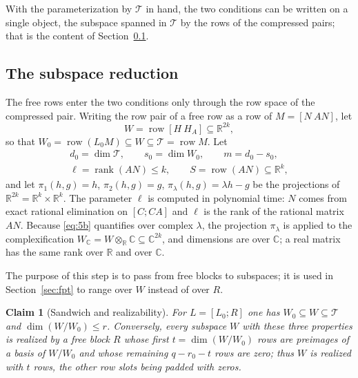 \documentclass[journal]{IEEEtran}
\theoremstyle{plainn}
\newtheorem{claim}{Claim}
\theoremstyle{remark}
\begin{document}
With the parameterization by $\mathcal T$ in hand, the two conditions can be written on a single
object, the subspace spanned in $\mathcal T$ by the rows of the compressed pairs; that is the content
of Section~\ref{sec:subspace}.

\subsection{The subspace reduction}\label{sec:subspace}

The free rows enter the two conditions only through the row space of the compressed
pair. Writing the row pair of a free row as a row of $M=[N\ AN]$, let
\begin{equation*}
W=\operatorname{row}[H\ H_A]\subseteq\mathbb R^{2k},
\end{equation*}
so that $W_0=\operatorname{row}(L_0M)\subseteq W\subseteq\mathcal T=\operatorname{row}M$.
Let
\begin{equation}\label{eq:ell}
\begin{gathered}
d_0=\dim\mathcal T,\qquad s_0=\dim W_0,\qquad m=d_0-s_0,\\
\ell=\operatorname{rank}(AN)\le k,\qquad S=\operatorname{row}(AN)\subseteq\mathbb R^k ,
\end{gathered}
\end{equation}
and let $\pi_1(h,g)=h$, $\pi_2(h,g)=g$, $\pi_\lambda(h,g)=\lambda h-g$ be the projections of
$\mathbb R^{2k}=\mathbb R^k\times\mathbb R^k$. The parameter $\ell$ is computed in polynomial time: $N$ comes from exact rational elimination on
$[C;CA]$ and $\ell$ is the rank of the rational matrix $AN$. Because \eqref{eq:5b} quantifies over complex
$\lambda$, the projection $\pi_\lambda$ is applied to the complexification
$W_{\mathbb C}=W\otimes_{\mathbb R}\mathbb C\subseteq\mathbb C^{2k}$, and dimensions are over
$\mathbb C$; a real matrix has the same rank over $\mathbb R$ and over $\mathbb C$.

The purpose of this step is to pass from free blocks to subspaces; it is used in Section~\ref{sec:fpt} to range over $W$ instead of over $R$.

\begin{claim}[Sandwich and realizability]\label{lem:sandwich}
For $L=[L_0;R]$ one has $W_0\subseteq W\subseteq\mathcal T$ and
$\dim(W/W_0)\le r$. Conversely, every subspace $W$ with these three properties is realized by a
free block $R$ whose first $t=\dim(W/W_0)$ rows are preimages of a basis of $W/W_0$ and whose
remaining $q-r_0-t$ rows are zero; thus $W$ is realized with $t$ rows, the other row slots being padded
with zeros.
\end{claim}
\end{document}
